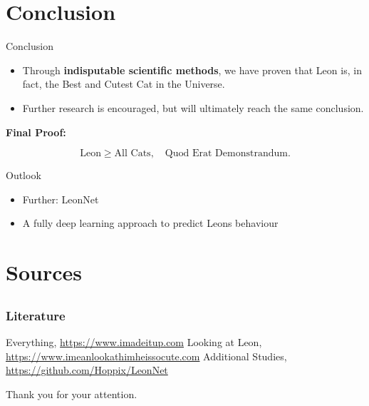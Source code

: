 \documentclass[compress]{beamer}
\begin{document}
\section{Conclusion}
\begin{frame}{Conclusion}
    \begin{itemize}
        \item Through \textbf{indisputable scientific methods}, we have proven that Leon is, in fact, the Best and Cutest Cat in the Universe.
        \item Further research is encouraged, but will ultimately reach the same conclusion.
    \end{itemize}

    \textbf{Final Proof:}

    \begin{equation}
        \text{Leon} \geq \text{All Cats}, \quad \text{Quod Erat Demonstrandum.}
    \end{equation}
\end{frame}

\begin{frame}{Outlook}
    \begin{itemize}
      \item Further: LeonNet
      \item A fully deep learning approach to predict Leons behaviour
    \end{itemize}

    \end{frame}
\section{Sources}
\subsection*{}

\begin{frame}
\frametitle{Literature}
\begin{small}
\begin{thebibliography}{50}
 Everything, \url{https://www.imadeitup.com}
 Looking at Leon, \url{https://www.imeanlookathimheissocute.com}
 Additional Studies, \url{https://github.com/Hoppix/LeonNet}
\end{thebibliography}
\end{small}
\end{frame}

\begin{frame}
Thank you for your attention.
\end{frame}
\end{document}
